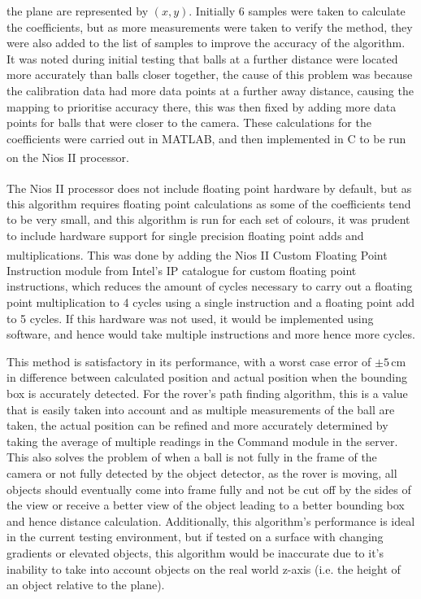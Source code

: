 \documentclass[a4paper]{article}
\newcommand{\unit}[1]{\ensuremath{\, \mathrm{#1}}}
\begin{document}
the plane are represented by \((x,y)\). Initially 6 samples were taken to calculate 
the coefficients, but as more measurements were taken to verify the method, they
were also added to the list of samples to improve the accuracy of the algorithm.
It was noted during initial testing that balls at a further distance were located
more accurately than balls closer together, the cause of this problem was because
the calibration data had more data points at a further away distance, causing the mapping
to prioritise accuracy there, this was then fixed by adding more data points for 
balls that were closer to the camera. 
These calculations for the coefficients were carried out in MATLAB, and then 
implemented in C to be run on the Nios\textsuperscript{\textregistered} II processor. 

The Nios\textsuperscript{\textregistered} II processor does not include floating point hardware by default, but as 
this algorithm requires floating point calculations as some of the coefficients 
tend to be very small, and this algorithm is run for each set of colours, it was
prudent to include hardware support for single precision floating point adds 
and multiplications. This was done by adding the Nios\textsuperscript{\textregistered} II Custom Floating Point Instruction module from Intel's IP catalogue 
for custom floating point instructions, which reduces the amount of cycles 
necessary to carry out a floating point multiplication to 4 cycles using a single
instruction and a floating point add to 5 cycles\cite{NiosIICustomInstruction}.
If this hardware was not used, it would be implemented using software, and hence
would take multiple instructions and more hence more cycles. 

This method is satisfactory in its performance, with a worst case error of \(\pm5\unit{cm}\)
in difference between calculated position and actual position when the bounding box is accurately detected. 
For the rover's path finding algorithm, this is a value that is easily taken into account and as
multiple measurements of the ball are taken, the actual position can be refined 
and more accurately determined by taking the average of multiple readings in the 
Command module in the server. This also solves the problem of when a ball is not 
fully in the frame of the camera or not fully detected by the object detector,
as the rover is moving, all objects should eventually come into frame fully and 
not be cut off by the sides of the view or receive a better view of the object 
leading to a better bounding box and hence distance calculation. 
Additionally, this algorithm's performance is ideal in the current testing environment, 
but if tested on a surface with changing gradients or elevated objects, this algorithm
would be inaccurate due to it's inability to take into account objects on the real
world z-axis (i.e. the height of an object relative to the plane).
\end{document}
